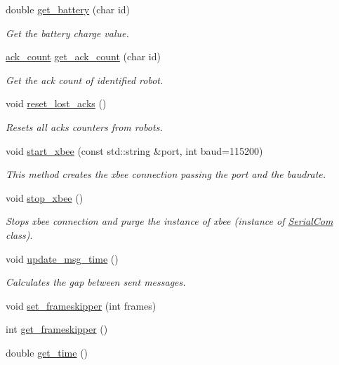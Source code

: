 \begin{DoxyCompactItemize}
double \hyperlink{class_flying_messenger_a8d9bc3b74d2cbad7bcefd2acf17205fd}{get\+\_\+battery} (char id)
\begin{DoxyCompactList}\small\item\em Get the battery charge value. \end{DoxyCompactList}\item 
\hyperlink{structack__count}{ack\+\_\+count} \hyperlink{class_flying_messenger_a89de5f227190cd364bb230ae530e8e4d}{get\+\_\+ack\+\_\+count} (char id)
\begin{DoxyCompactList}\small\item\em Get the ack count of identified robot. \end{DoxyCompactList}\item 
void \hyperlink{class_flying_messenger_a6969f87aa1dde273b7e25de3f5d78f91}{reset\+\_\+lost\+\_\+acks} ()
\begin{DoxyCompactList}\small\item\em Resets all acks counters from robots. \end{DoxyCompactList}\item 
void \hyperlink{class_flying_messenger_ae0513090a7933976d04ce67f4d90b1f3}{start\+\_\+xbee} (const std\+::string \&port, int baud=115200)
\begin{DoxyCompactList}\small\item\em This method creates the xbee connection passing the port and the baudrate. \end{DoxyCompactList}\item 
void \hyperlink{class_flying_messenger_ab9ed5a0b43196b5771a469c03f213856}{stop\+\_\+xbee} ()
\begin{DoxyCompactList}\small\item\em Stops xbee connection and purge the instance of xbee (instance of \hyperlink{class_serial_com}{Serial\+Com} class). \end{DoxyCompactList}\item 
void \hyperlink{class_flying_messenger_a0bcca6b75e89b91681685da9f7bc54f1}{update\+\_\+msg\+\_\+time} ()
\begin{DoxyCompactList}\small\item\em Calculates the gap between sent messages. \end{DoxyCompactList}\item 
void \hyperlink{class_flying_messenger_adc63fb3138c384505382a170729c5c1c}{set\+\_\+frameskipper} (int frames)
\item 
int \hyperlink{class_flying_messenger_abf612e12b2a70f8069defbaa265d30d7}{get\+\_\+frameskipper} ()
\item 
double \hyperlink{class_flying_messenger_ac21061f46ad40fc1e352b6169ad4b62a}{get\+\_\+time} ()
\end{DoxyCompactItemize}
